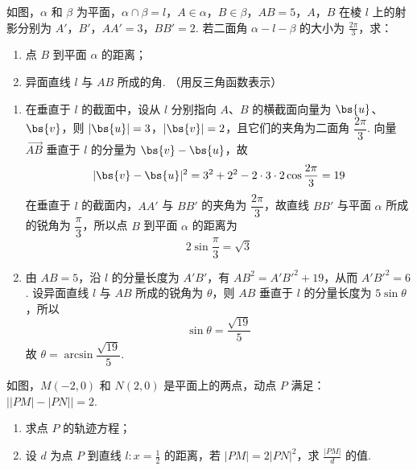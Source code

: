 \begin{problem}
如图，\(\alpha\) 和 \(\beta\) 为平面，\(\alpha \cap \beta = l\)，\(A \in \alpha\)，\(B \in \beta\)，\(AB = 5\)，\(A\)，\(B\) 在棱 \(l\) 上的射影分别为 \(A'\)，\(B'\)，\(AA' = 3\)，\(BB' = 2\). 若二面角 \(\alpha - l - \beta\) 的大小为 \(\frac{2\pi}{3}\)，求：

\begin{enumerate}
\item 点 \(B\) 到平面 \(\alpha\) 的距离；
\item 异面直线 \(l\) 与 \(AB\) 所成的角. （用反三角函数表示）
\end{enumerate}

\FloatBarrier
\end{problem}

\begin{solution}
\begin{enumerate}
\item 在垂直于 \(l\) 的截面中，设从 \(l\) 分别指向 \(A\)、\(B\) 的横截面向量为 \(\bs{u}\)、\(\bs{v}\)，则 \(|\bs{u}|=3\)，\(|\bs{v}|=2\)，且它们的夹角为二面角 \(\dfrac{2\pi}{3}\). 向量 \(\overrightarrow{AB}\) 垂直于 \(l\) 的分量为 \(\bs{v}-\bs{u}\)，故
\[
|\bs{v}-\bs{u}|^{2}=3^{2}+2^{2}-2\cdot3\cdot2\cos\frac{2\pi}{3}=19
\]
在垂直于 \(l\) 的截面内，\(AA'\) 与 \(BB'\) 的夹角为 \(\dfrac{2\pi}{3}\)，故直线 \(BB'\) 与平面 \(\alpha\) 所成的锐角为 \(\dfrac{\pi}{3}\)，所以点 \(B\) 到平面 \(\alpha\) 的距离为
\[
2\sin\frac{\pi}{3}=\sqrt{3}
\]
\item 由 \(AB=5\)，沿 \(l\) 的分量长度为 \(A'B'\)，有 \(AB^{2}=A'B'^{2}+19\)，从而 \(A'B'^{2}=6\). 设异面直线 \(l\) 与 \(AB\) 所成的锐角为 \(\theta\)，则 \(AB\) 垂直于 \(l\) 的分量长度为 \(5\sin\theta\)，所以
\[
\sin\theta=\frac{\sqrt{19}}{5}
\]
故 \(\theta=\arcsin\dfrac{\sqrt{19}}{5}\).
\end{enumerate}
\end{solution}

\begin{problem}
如图，\(M(-2,0)\) 和 \(N(2,0)\) 是平面上的两点，动点 \(P\) 满足： \(\left||PM|-|PN|\right| = 2\).

\begin{enumerate}
\item 求点 \(P\) 的轨迹方程；
\item 设 \(d\) 为点 \(P\) 到直线 \(l: x = \frac{1}{2}\) 的距离，若 \(|PM| = 2|PN|^2\)，求 \(\frac{|PM|}{d}\) 的值.
\end{enumerate}

\FloatBarrier
\end{problem}

